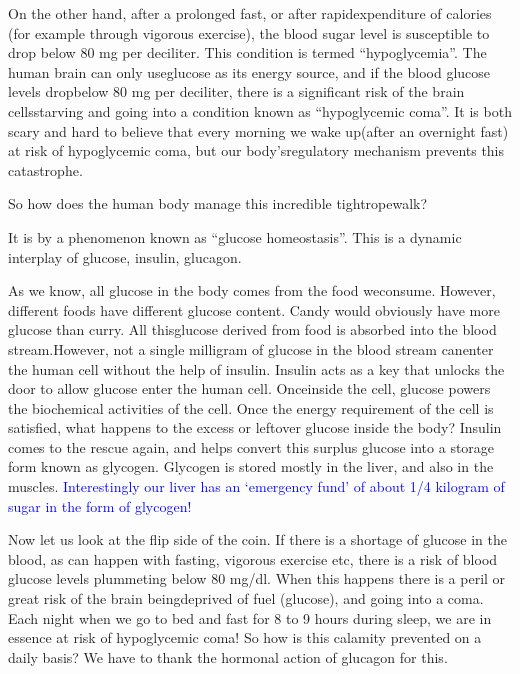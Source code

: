 \vskip 6pt
On the other hand, after a prolonged fast, or after rapid\break expenditure of calories (for example through vigorous exercise), the blood sugar level is susceptible to drop below 80 mg per deciliter. This condi\-tion is termed “hypoglycemia”. The human brain can only use\break glucose as its energy source, and if the blood glucose levels drop\break below 80 mg per deciliter, there is a significant risk of the brain cells\break star\-ving and going into a condition known as “hypoglycemic coma”. It is both scary and hard to believe that every morning we wake up\break (after an overnight fast) at risk of hypoglycemic coma, but our body’s\break regulatory mechanism prevents this catastrophe.

\vskip 6pt
So how does the human body manage this incredible tightrope\break walk?

\vskip 6pt
It is by a phenomenon known as “glucose homeostasis”. This is a dynamic interplay of glucose, insulin, glucagon.

\vskip 6pt
As we know, all glucose in the body comes from the food we\break consume. However, different foods have different glucose content. Candy would obviously have more glucose than curry. All this\break glucose derived from food is absorbed into the blood stream.\break However, not a single milligram of glucose in the blood stream can\break enter the human cell without the help of insulin. Insulin acts as a key that unlocks the door to allow glucose enter the human cell. Once\break inside the cell, glucose powers the biochemical activities of the cell. Once the energy requirement of the cell is satisfied, what happens to the excess or leftover glucose inside the body? Insulin comes to the rescue again, and helps convert this surplus glucose into a storage form known as glycogen. Glycogen is stored mostly in the liver, and also in the muscles. \textcolor{blue}{Interestingly our liver has an ‘emergency fund’ of about 1/4 kilogram of sugar in the form of glycogen!}

\vskip 6pt
Now let us look at the flip side of the coin. If there is a shortage of glucose in the blood, as can happen with fasting, vigorous exercise etc, there is a risk of blood glucose levels plummeting below 80 mg/dl. When this happens there is a peril or great risk of the brain being\break deprived of fuel (glucose), and going into a coma. Each night when we go to bed and fast for 8 to 9 hours during sleep, we are in essence at risk of hypoglycemic coma! So how is this calamity prevented on a daily basis? We have to thank the hormonal action of glucagon for this.

